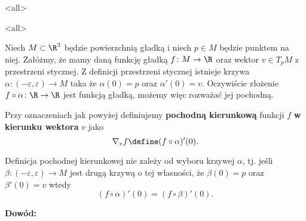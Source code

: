 \mode*
\mode<all>{}

\mode<all>{}

\begin{frame}

Niech $M\subset \R^3$ będzie powierzchnią gładką i niech $p\in M$ będzie punktem na niej. Załóżmy, że mamy daną funkcję gładką $f\colon M\to \R$ oraz wektor $v\in T_pM$ z przestrzeni stycznej. \pause Z definicji przestrzeni stycznej istnieje krzywa $\alpha\colon (-\varepsilon,\varepsilon)\to M$ taka że $\alpha(0)=p$ oraz $\alpha'(0)=v$. \pause Oczywiście złożenie $f\circ \alpha\colon \R\to \R$ jest funkcją gładką, możemy więc rozważać jej pochodną.

\pause \begin{definicja}
Przy oznaczeniach jak powyżej definiujemy \textbf{pochodną kierunkową} funkcji $f$ \textbf{w kierunku wektora} $v$ jako 
\[\nabla_vf\define (f\circ \alpha)'(0).\]
\end{definicja}

\end{frame}
\begin{frame}
\begin{lemat}
Definicja pochodnej kierunkowej nie zależy od wyboru krzywej $\alpha$, tj. jeśli $\beta\colon (-\varepsilon,\varepsilon)\to M$ jest drugą krzywą o tej własności, że $\beta(0)=p$ oraz $\beta'(0)=v$ wtedy \[\left(f\circ \alpha\right)'(0)=\left(f\circ \beta\right)'(0).\]
\end{lemat}
\textcolor{ared}{\textbf{Dowód:}}\\\pause
{}


\end{frame}
